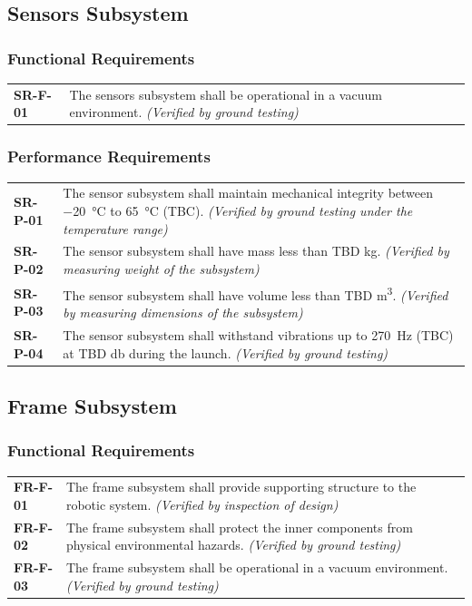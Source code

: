 \documentclass[12pt, letterpaper]{article}
\begin{document}
\subsection{Sensors Subsystem}
\label{sect:sensors}
\subsubsection*{Functional Requirements}
\vspace{-20pt}
\begin{longtable}{P{2cm}P{13.75cm}}
\textbf{SR-F-01}	&
The sensors subsystem shall be operational in a vacuum environment.
\textit{(Verified by ground testing)}
\end{longtable}

\subsubsection*{Performance Requirements}
\vspace{-20pt}
\begin{longtable}{P{2cm}P{13.75cm}}
\textbf{SR-P-01}	&
The sensor subsystem shall maintain mechanical integrity between \SI{-20}{\degreeCelsius} to \SI{65}{\degreeCelsius} (TBC).
\textit{(Verified by ground testing under the temperature range)}	\\
\textbf{SR-P-02}	& The sensor subsystem shall have mass less than TBD \si{\kilo\gram}.
\textit{(Verified by measuring weight of the subsystem)}	\\
\textbf{SR-P-03}	&
The sensor subsystem shall have volume less than TBD \si{\metre\cubed}.
\textit{(Verified by measuring dimensions of the subsystem)}	\\
\textbf{SR-P-04}	&
The sensor subsystem shall withstand vibrations up to \SI{270}{\hertz} (TBC) at TBD \si{\decibel} during the launch.
\textit{(Verified by ground testing)}
\end{longtable}

\subsection{Frame Subsystem}
\label{sect:frame}
\subsubsection*{Functional Requirements}
\vspace{-20pt}
\begin{longtable}{P{2cm}P{13.75cm}}
\textbf{FR-F-01}	&
The frame subsystem shall provide supporting structure to the robotic system.
\textit{(Verified by inspection of design)}		\\
\textbf{FR-F-02}	&
The frame subsystem shall protect the inner components from physical environmental hazards.
\textit{(Verified by ground testing)}	\\
\textbf{FR-F-03}	&
The frame subsystem shall be operational in a vacuum environment.
\textit{(Verified by ground testing)}
\end{longtable}
\end{document}
